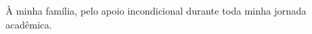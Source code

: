\begin{dedicatoria}
À minha família, pelo apoio incondicional durante toda minha jornada acadêmica.
\end{dedicatoria}